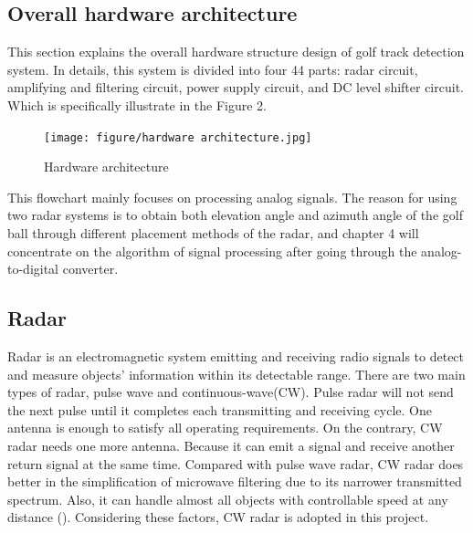\subsection{Overall hardware architecture}
This section explains the overall hardware structure design of golf track detection system. In details, this system is divided into four 
44
 parts: radar circuit, amplifying and filtering circuit, power supply circuit, and DC level shifter circuit. Which is specifically illustrate in the Figure 2.
\begin{figure}[H]
    \centering
    \texttt{[image: figure/hardware
    architecture.jpg]}
    \caption{Hardware architecture}
\end{figure}
This flowchart mainly focuses on processing analog signals. The reason for using two radar systems is to obtain both elevation angle and azimuth angle of the golf ball through different placement methods of the radar, and chapter 4 will concentrate on the algorithm of signal processing after going through the analog-to-digital converter.
\subsection{Radar}
Radar is an electromagnetic system emitting and receiving radio signals to detect and measure objects’ information within its detectable range. There are two main types of radar, pulse wave and continuous-wave(CW). Pulse radar will not send the next pulse until it completes each transmitting and receiving cycle. One antenna is enough to satisfy all operating requirements. On the contrary, CW radar needs one more antenna. Because it can emit a signal and receive another return signal at the same time. Compared with pulse wave radar, CW radar does better in the simplification of microwave filtering due to its narrower transmitted spectrum. Also, it can handle almost all objects with controllable speed at any distance (\cite{skolnik1970radar}). Considering these factors, CW radar is adopted in this project. 

